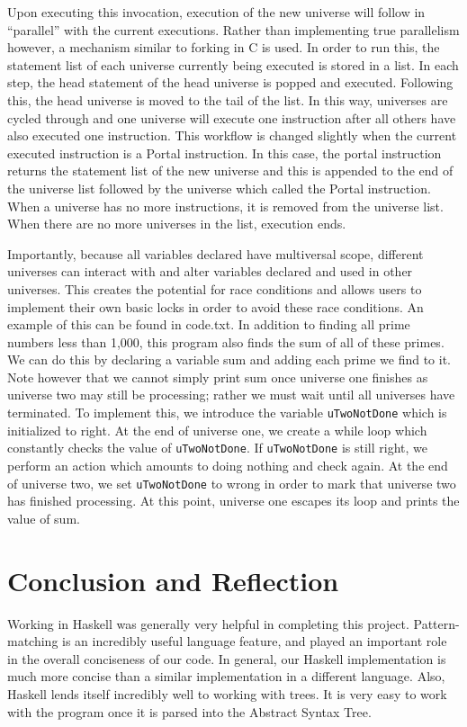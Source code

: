 \documentclass[numbers]{sigplanconf}
\begin{document}
	
Upon executing this invocation, execution of the new universe will follow in “parallel” with the current executions. Rather than implementing true parallelism however, a mechanism similar to forking in C is used. In order to run this, the statement list of each universe currently being executed is stored in a list. In each step, the head statement of the head universe is popped and executed. Following this, the head universe is moved to the tail of the list. In this way, universes are cycled through and one universe will execute one instruction after all others have also executed one instruction. This workflow is changed slightly when the current executed instruction is a Portal instruction. In this case, the portal instruction returns the statement list of the new universe and this is appended to the end of the universe list followed by the universe which called the Portal instruction. When a universe has no more instructions, it is removed from the universe list. When there are no more universes in the list, execution ends.

Importantly, because all variables declared have multiversal scope, different universes can interact with and alter variables declared and used in other universes. This creates the potential for race conditions and allows users to implement their own basic locks in order to avoid these race conditions. An example of this can be found in code.txt. In addition to finding all prime numbers less than 1,000, this program also finds the sum of all of these primes. We can do this by declaring a variable sum and adding each prime we find to it. Note however that we cannot simply print sum once universe one finishes as universe two may still be processing; rather we must wait until all universes have terminated. To implement this, we introduce the variable \texttt{uTwoNotDone} which is initialized to right. At the end of universe one, we create a while loop which constantly checks the value of \texttt{uTwoNotDone}. If \texttt{uTwoNotDone} is still right, we perform an action which amounts to doing nothing and check again. At the end of universe two, we set \texttt{uTwoNotDone} to wrong in order to mark that universe two has finished processing. At this point, universe one escapes its loop and prints the value of sum.


\section{Conclusion and Reflection}

Working in Haskell was generally very helpful in completing this project. Pattern-matching is an incredibly useful language feature, and played an important role in the overall conciseness of our code. In general, our Haskell implementation is much more concise than a similar implementation in a different language. Also, Haskell lends itself incredibly well to working with trees. It is very easy to work with the program once it is parsed into the Abstract Syntax Tree. 
\end{document}
